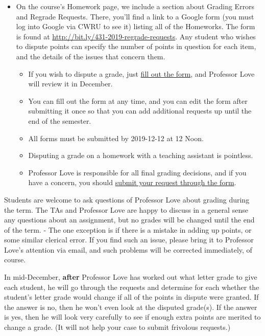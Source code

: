 \documentclass[
]{book}
\providecommand{\tightlist}{%
  \setlength{\itemsep}{0pt}\setlength{\parskip}{0pt}}
\begin{document}
\begin{itemize}
\tightlist
\item
  On the course's Homework page, we include a section about Grading Errors and Regrade Requests. There, you'll find a link to a Google form (you must log into Google via CWRU to see it) listing all of the Homeworks. The form is found at \url{http://bit.ly/431-2019-regrade-requests}. Any student who wishes to dispute points can specify the number of points in question for each item, and the details of the issues that concern them.

  \begin{itemize}
  \tightlist
  \item
    If you wish to dispute a grade, just \href{http://bit.ly/431-2019-regrade-requests}{fill out the form}, and Professor Love will review it in December.
  \item
    You can fill out the form at any time, and you can edit the form after submitting it once so that you can add additional requests up until the end of the semester.
  \item
    All forms must be submitted by 2019-12-12 at 12 Noon.
  \item
    Disputing a grade on a homework with a teaching assistant is pointless.
  \item
    Professor Love is responsible for all final grading decisions, and if you have a concern, you should \href{http://bit.ly/431-2019-regrade-requests}{submit your request through the form}.
  \end{itemize}
\end{itemize}

Students are welcome to ask questions of Professor Love about grading during the term. The TAs and Professor Love are happy to discuss in a general sense any questions about an assignment, but no grades will be changed until the end of the term.
- The one exception is if there is a mistake in adding up points, or some similar clerical error. If you find such an issue, please bring it to Professor Love's attention via email, and such problems will be corrected immediately, of course.

In mid-December, \textbf{after} Professor Love has worked out what letter grade to give each student, he will go through the requests and determine for each whether the student's letter grade would change if all of the points in dispute were granted. If the answer is no, then he won't even look at the disputed grade(s). If the answer is yes, then he will look very carefully to see if enough extra points are merited to change a grade. (It will not help your case to submit frivolous requests.)
\end{document}
